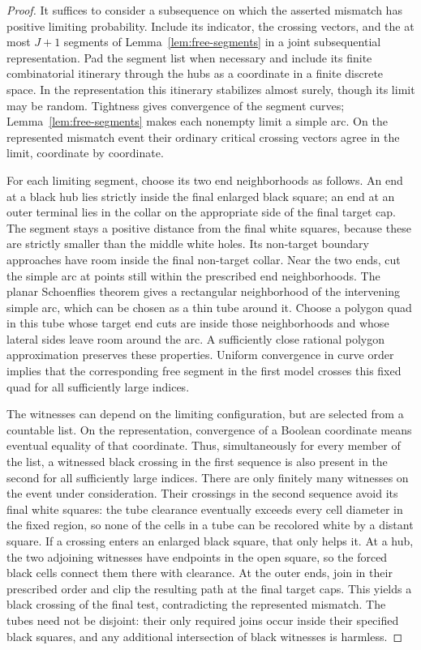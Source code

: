 \begin{proof}
It suffices to consider a subsequence on which the asserted mismatch has
positive limiting probability. Include its indicator, the crossing vectors,
and the at most $J+1$ segments of Lemma~\ref{lem:free-segments} in a joint
subsequential representation. Pad the segment list when necessary and
include its finite combinatorial itinerary through the hubs as a coordinate
in a finite discrete space. In the representation this itinerary stabilizes
almost surely, though its limit may be random. Tightness gives convergence
of the segment curves;
Lemma~\ref{lem:free-segments} makes each nonempty limit a simple arc.
On the represented mismatch event their ordinary critical crossing vectors
agree in the limit, coordinate by coordinate.

For each limiting segment, choose its two end neighborhoods as follows.
An end at a black hub lies strictly inside the final enlarged black square;
an end at an outer terminal lies in the collar on the appropriate side of
the final target cap. The segment stays a positive distance from the final
white squares, because these are strictly smaller than the middle white
holes. Its non-target boundary approaches have room inside the final
non-target collar. Near the two ends, cut the simple arc at points still
within the prescribed end neighborhoods. The planar Schoenflies theorem gives a rectangular neighborhood of the
intervening simple arc, which can be chosen as a thin tube around it. Choose a polygon quad in this
tube whose target end cuts are inside those neighborhoods and whose lateral
sides leave room around the arc. A sufficiently close rational polygon
approximation preserves these properties. Uniform convergence in curve
order implies that the corresponding free segment in the first model
crosses this fixed quad for all sufficiently large indices.

The witnesses can depend on the limiting configuration, but are selected
from a countable list. On the representation, convergence of a Boolean
coordinate means eventual equality of that coordinate. Thus, simultaneously
for every member of the list, a witnessed black crossing in the first
sequence is also present in the second for all sufficiently large indices.
There are only finitely many witnesses on the event under consideration.
Their crossings in the second sequence avoid its final white squares: the
tube clearance eventually exceeds every cell diameter in the fixed region,
so none of the cells in a tube can be recolored white by a distant square. If
a crossing enters an enlarged black square, that only helps it. At a hub,
the two adjoining witnesses have endpoints in the open square, so the forced
black cells connect them there with clearance. At the outer ends, join in
their prescribed order and clip the resulting path at the final target caps.
This yields a black crossing of the final test, contradicting the represented
mismatch. The tubes need not be disjoint: their only required joins occur
inside their specified black squares, and any additional intersection of
black witnesses is harmless.


\end{proof}
